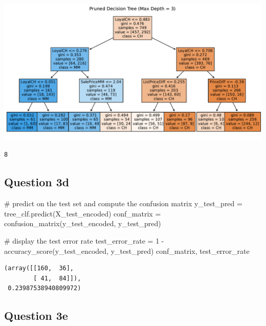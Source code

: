 \documentclass[
  letterpaper,
  DIV=11,
  numbers=noendperiod]{scrartcl}
\newenvironment{Shaded}{\begin{snugshade}}{\end{snugshade}}
\newcommand{\CommentTok}[1]{\textcolor[rgb]{0.37,0.37,0.37}{#1}}
\newcommand{\DecValTok}[1]{\textcolor[rgb]{0.68,0.00,0.00}{#1}}
\newcommand{\NormalTok}[1]{\textcolor[rgb]{0.00,0.23,0.31}{#1}}
\newcommand{\OperatorTok}[1]{\textcolor[rgb]{0.37,0.37,0.37}{#1}}
\begin{document}
\includegraphics{PS4_files/figure-pdf/cell-13-output-2.pdf}

\begin{verbatim}
8
\end{verbatim}

\subsection{Question 3d}\label{question-3d}

\begin{Shaded}
\begin{Highlighting}[]
\CommentTok{\# predict on the test set and compute the confusion matrix}
\NormalTok{y\_test\_pred }\OperatorTok{=}\NormalTok{ tree\_clf.predict(X\_test\_encoded)}
\NormalTok{conf\_matrix }\OperatorTok{=}\NormalTok{ confusion\_matrix(y\_test\_encoded, y\_test\_pred)}

\CommentTok{\# display the test error rate}
\NormalTok{test\_error\_rate }\OperatorTok{=} \DecValTok{1} \OperatorTok{{-}}\NormalTok{ accuracy\_score(y\_test\_encoded, y\_test\_pred)}
\NormalTok{conf\_matrix, test\_error\_rate}
\end{Highlighting}
\end{Shaded}

\begin{verbatim}
(array([[160,  36],
        [ 41,  84]]),
 0.23987538940809972)
\end{verbatim}

\subsection{Question 3e}\label{question-3e}
\end{document}
